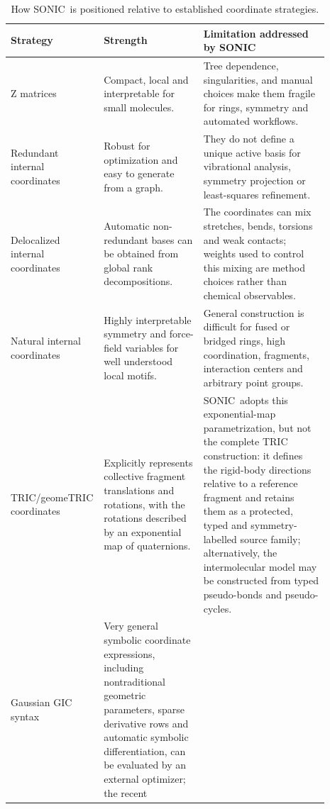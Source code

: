 \documentclass[journal=jctcce,manuscript=article,layout=traditional]{achemso}
\newcommand{\SONIC}{SONIC}
\theoremstyle{definition}
\begin{document}
\begin{table}[htbp]
\centering
\scriptsize
\setlength{\tabcolsep}{3pt}
\renewcommand{\arraystretch}{0.92}
\caption{How \SONIC\ is positioned relative to established coordinate strategies.}
\label{tab:context}
\begin{tabular}{p{0.19\linewidth}p{0.31\linewidth}p{0.39\linewidth}}
\toprule
Strategy & Strength & Limitation addressed by \SONIC \\
\midrule
Z matrices & Compact, local and interpretable for small molecules. & Tree
dependence, singularities, and manual choices make them fragile for rings,
symmetry and automated workflows.\cite{BakerHehre1991ZMatrix} \\
\midrule
Redundant internal coordinates & Robust for optimization and easy to generate
from a graph.\cite{PulayFogarasi1992,Peng1996Redundant,BakkenHelgaker2002} &
They do not define a unique active basis for vibrational analysis, symmetry
projection or least-squares refinement. \\
\midrule
Delocalized internal coordinates & Automatic non-redundant bases can be
obtained from global rank decompositions.\cite{Baker1996Delocalized} & The
coordinates can mix stretches, bends, torsions and weak contacts; weights used
to control this mixing are method choices rather than chemical observables. \\
\midrule
Natural internal coordinates & Highly interpretable symmetry and force-field
variables for well understood local motifs.\cite{Berces1997NaturalMetal,VonArnimAhlrichs1999GNIC,SwartBickelhaupt2006StrongWeak}
& General construction is difficult for fused or bridged rings, high
coordination, fragments, interaction centers and arbitrary point groups. \\
\midrule
TRIC/geomeTRIC coordinates & Explicitly represents collective fragment
translations and rotations, with the rotations described by an exponential map
of quaternions.\cite{WangSong2016GeomeTRIC} & \SONIC\ adopts this
exponential-map parametrization, but not the complete TRIC construction: it
defines the rigid-body directions relative to a reference fragment and retains
them as a protected, typed and symmetry-labelled source family; alternatively,
the intermolecular model may be constructed from typed pseudo-bonds and
pseudo-cycles. \\
\midrule
Gaussian GIC syntax & Very general symbolic coordinate expressions, including
nontraditional geometric parameters, sparse derivative rows and automatic
symbolic differentiation, can be evaluated by an external optimizer; the recent

\end{tabular}
\end{table}
\end{document}
